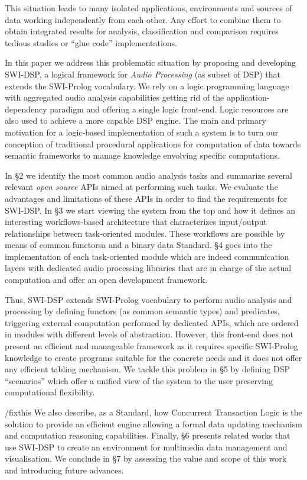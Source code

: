 \documentclass[runningheads]{llncs}
\begin{document}
This situation leads to many isolated applications, environments and sources of data working independently from each other. Any effort to combine them to obtain integrated results for analysis, classification and comparison requires tedious studies or ``glue code'' implementations.

In this paper we address this problematic situation by proposing and developing SWI-DSP, a logical framework for \textit{Audio Processing} (as subset of DSP) that extends the SWI-Prolog vocabulary. We rely on a logic programming language with aggregated audio analysis capabilities getting rid of the application-dependency paradigm and offering a single logic front-end. Logic resources are also used to achieve a more capable DSP engine. The main and primary motivation for a logic-based implementation of such a system is to turn our conception of traditional procedural applications for computation of data towards semantic frameworks to manage knowledge envolving specific computations.

In \S 2 we identify the most common audio analysis tasks and summarize several relevant \textit{open source} APIs aimed at performing such tasks. We evaluate the advantages and limitations of these APIs in order to find the requirements for SWI-DSP. In \S 3 we start viewing the system from the top and how it defines an interesting workflows-based architecture that characterizes input/output relationships between task-oriented modules. These workflows are possible by means of common functorsa and a binary data Standard. \S 4 goes into the implementation of each task-oriented module which are indeed communication layers with dedicated audio processing libraries that are in charge of the actual computation and offer an open development framework.

Thus, SWI-DSP extends SWI-Prolog vocabulary to perform audio analysis and processing by defining functors (as common semantic types) and predicates, triggering external computation performed by dedicated APIs, which are ordered in modules with different levels of abstraction. However, this front-end does not present an efficient and manageable framework as it requires specific SWI-Prolog knowledge to create programs suitable for the concrete needs and it does not offer any efficient tabling mechanism. We tackle this problem in \S 5 by defining DSP ``scenarios'' which offer a unified view of the system to the user preserving computational flexibility.

/fixthis
We also describe, as a Standard, how Concurrent Transaction Logic is the solution to provide an efficient engine allowing a formal data updating mechanism and computation reasoning capabilities. Finally, \S 6 presents related works that use SWI-DSP to create an environment for multimedia data management and visualisation. We conclude in \S 7 by assessing the value and scope of this work and introducing future advances.
\end{document}
